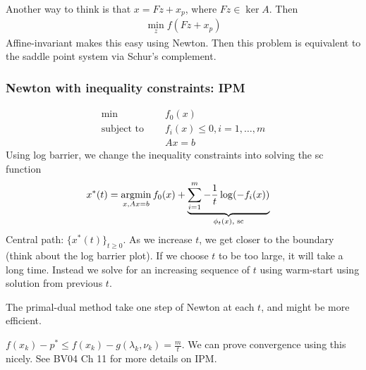 \documentclass[class=article,crop=false]{standalone}
\begin{document}
Another way to think is that $ x = Fz + x_p$, where  $ Fz \in \ker A$. Then
\begin{align*}
	\min_{z} f(Fz+x_p)
\end{align*}
Affine-invariant makes this easy using Newton. Then this problem is equivalent to the saddle point system via Schur's complement.
\subsubsection{Newton with inequality constraints: IPM}
\begin{align*}
\min\quad &f_0(x) \\
\text{subject to } \quad &f_i(x) \leq 0, i = 1,\ldots,m \\
			 & Ax=b
\end{align*}
Using log barrier, we change the inequality constraints into solving the sc function
\begin{align*}
	x^* (t) &= \operatorname*{argmin}_{x, Ax=b} f_0(x) +  \underbrace{ \sum_{ i= 1}^{ m} -\frac{1}{t} \log(-f_i(x)) }_{ \phi_t(x), \text{ sc} }
\end{align*}
Central path: $ \{x^* (t)\}_{t \geq 0} $. As we increase $ t$, we get closer to the boundary (think about the log barrier plot). If we choose $ t$ to be too large, it will take a long time. Instead we solve for an increasing sequence of  $ t$ using warm-start using solution from previous $ t$. 

The primal-dual method take one step of Newton at each $ t$, and might be more efficient.

$ f(x_k) - p^* \leq f(x_k) - g( \lambda_k, \nu_k) = \frac{m}{t}$. We can prove convergence using this nicely. See BV04 Ch 11 for more details on IPM.
\end{document}
